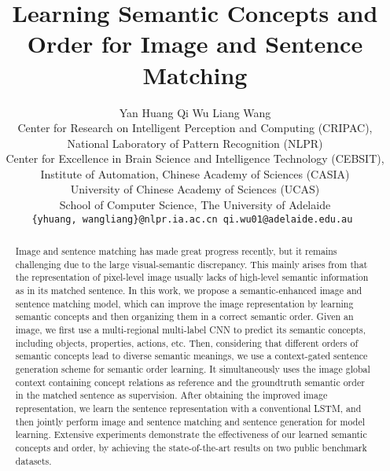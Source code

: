 \documentclass[10pt,twocolumn,letterpaper]{article}
\begin{document}
\title{Learning Semantic Concepts and Order for Image and Sentence Matching } 

\author{Yan Huang \hspace{7mm} Qi Wu  \hspace{7mm} Liang Wang\\
Center for Research on Intelligent Perception and Computing (CRIPAC),\\
National Laboratory of Pattern Recognition (NLPR)\\
Center for Excellence in Brain Science and Intelligence Technology (CEBSIT),\\
Institute of Automation, Chinese Academy of Sciences (CASIA)\\
University of Chinese Academy of Sciences (UCAS)\\
School of Computer Science, The University of Adelaide\\
{\tt\small \{yhuang, wangliang\}@nlpr.ia.ac.cn \hspace{3mm} qi.wu01@adelaide.edu.au }
}


\maketitle


\begin{abstract}
   Image and sentence matching has made great progress recently, but it
   remains challenging due to the large visual-semantic discrepancy.
   This mainly arises from that the representation of pixel-level image usually lacks of
   high-level semantic information as in its matched sentence.
   In this work, we propose a semantic-enhanced image and sentence matching model,
   which can improve the image representation
   by learning semantic concepts and then organizing them in a correct semantic order.
   Given an image, we first use a multi-regional multi-label CNN
   to predict its semantic concepts, including objects, properties, actions, etc.
Then, considering that different orders of semantic concepts lead to
   diverse semantic meanings,
   we use a context-gated sentence generation scheme for semantic order learning.
   It simultaneously uses the image global context containing concept relations as reference
   and the groundtruth semantic order in the matched sentence as supervision.
   After obtaining the improved image representation, we learn the sentence representation
   with a conventional LSTM, and then jointly perform image and sentence matching
   and sentence generation for model learning.
   Extensive experiments demonstrate the effectiveness of
   our learned semantic concepts and order,
   by achieving the state-of-the-art results on two public benchmark datasets.


\end{abstract}
\end{document}
